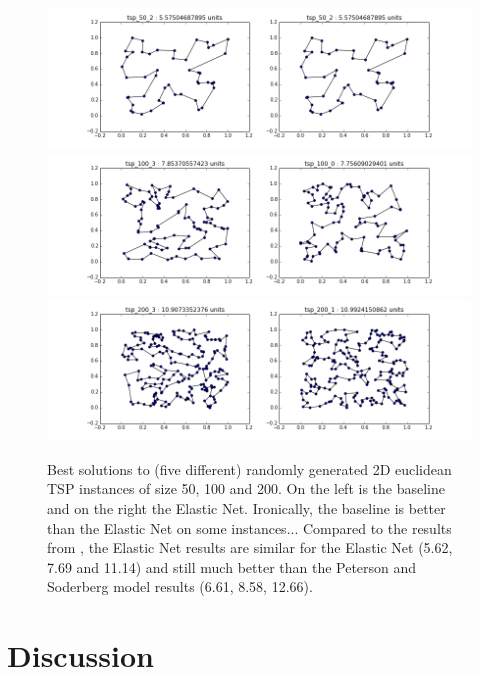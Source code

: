\documentclass{article} %
\begin{document}
\begin{figure}[!htb]
\begin{center}
\includegraphics[scale=0.45]{figs/random_tsp_50}
\includegraphics[scale=0.45]{figs/random_tsp_100}
\includegraphics[scale=0.45]{figs/random_tsp_200}

\caption{\small Best solutions to (five different) randomly generated 2D euclidean TSP instances of size 50, 100 and 200. On the left is the baseline and on the right the Elastic Net. Ironically, the baseline is better than the Elastic Net on some instances... Compared to the results from \citep{potvin_ann}, the Elastic Net results are similar for the Elastic Net (5.62, 7.69 and 11.14) and still much better than the Peterson and Soderberg model results (6.61, 8.58, 12.66).}
\label{random_results}
\end{center}
\end{figure}





\newpage
\section{Discussion}
\label{discussion}
\end{document}
